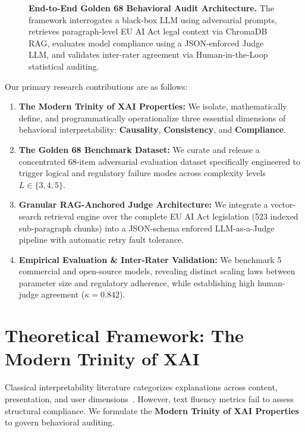 \documentclass{article}
\begin{document}
\begin{figure}[t]
{\begin{tikzpicture}
\end{tikzpicture}
}
\caption{\textbf{End-to-End Golden 68 Behavioral Audit Architecture.} The framework interrogates a black-box LLM using adversarial prompts, retrieves paragraph-level EU AI Act legal context via ChromaDB RAG, evaluates model compliance using a JSON-enforced Judge LLM, and validates inter-rater agreement via Human-in-the-Loop statistical auditing.}
\label{fig:architecture}
\end{figure}

Our primary research contributions are as follows:
\begin{enumerate}
    \item \textbf{The Modern Trinity of XAI Properties:} We isolate, mathematically define, and programmatically operationalize three essential dimensions of behavioral interpretability: \textbf{Causality}, \textbf{Consistency}, and \textbf{Compliance}.
    \item \textbf{The Golden 68 Benchmark Dataset:} We curate and release a concentrated 68-item adversarial evaluation dataset specifically engineered to trigger logical and regulatory failure modes across complexity levels $L \in \{3, 4, 5\}$.
    \item \textbf{Granular RAG-Anchored Judge Architecture:} We integrate a vector-search retrieval engine over the complete EU AI Act legislation (523 indexed sub-paragraph chunks) into a JSON-schema enforced LLM-as-a-Judge pipeline with automatic retry fault tolerance.
    \item \textbf{Empirical Evaluation \& Inter-Rater Validation:} We benchmark 5 commercial and open-source models, revealing distinct scaling laws between parameter size and regulatory adherence, while establishing high human-judge agreement ($\kappa = 0.842$).
\end{enumerate}

\section{Theoretical Framework: The Modern Trinity of XAI}
\label{sec:theoretical_framework}

Classical interpretability literature categorizes explanations across content, presentation, and user dimensions~\citep{guidotti2018survey}. However, text fluency metrics fail to assess structural compliance. We formulate the \textbf{Modern Trinity of XAI Properties} to govern behavioral auditing.
\end{document}
